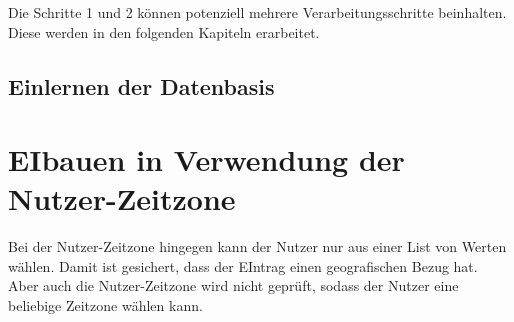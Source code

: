 				Die Schritte 1 und 2 können potenziell mehrere Verarbeitungsschritte beinhalten. 
				Diese werden in den folgenden Kapiteln erarbeitet. 





			\subsection{Einlernen der Datenbasis}




\section{EIbauen in Verwendung der Nutzer-Zeitzone} 

Bei der Nutzer-Zeitzone hingegen kann der Nutzer nur aus einer List von Werten wählen. 
				Damit ist gesichert, dass der EIntrag einen geografischen Bezug hat. 
				Aber auch die Nutzer-Zeitzone wird nicht geprüft, sodass der Nutzer eine beliebige Zeitzone wählen kann. 

				








	
